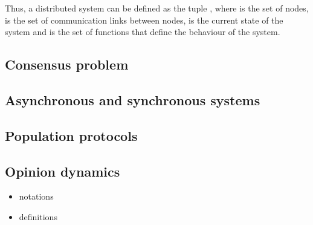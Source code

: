 Thus, a distributed system can be defined as the tuple , where  is the set of nodes,  is the set of communication links between nodes,  is the current state of the system and  is the set of functions that define the behaviour of the system.

\subsection{Consensus problem}



\subsection{Asynchronous and synchronous systems}

\subsection{Population protocols}

\subsection{Opinion dynamics}

\begin{itemize}
    \item notations
    \item definitions
\end{itemize}

